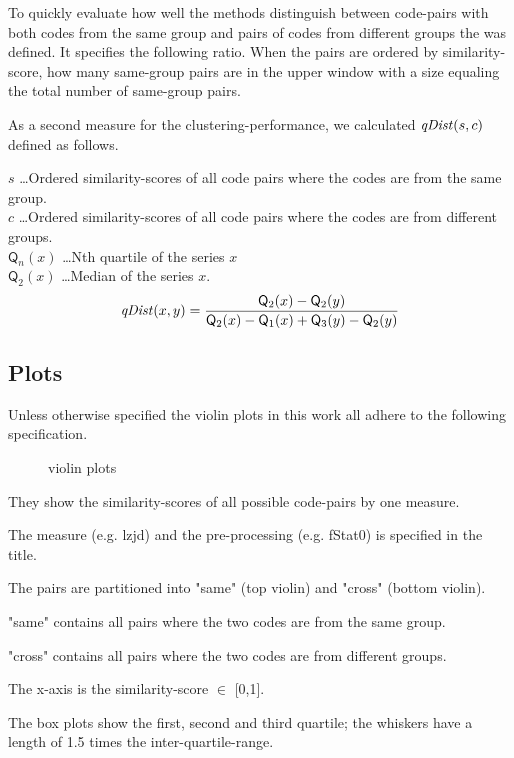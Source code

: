 \documentclass[../main.tex]{subfiles}
\begin{document}
To quickly evaluate how well the methods distinguish between code-pairs with both codes from the same group and pairs of codes from different groups the  was defined.
It specifies the following ratio.
When the pairs are ordered by similarity-score, how many same-group pairs are in the upper window with a size equaling the total number of same-group pairs.

As a second measure for the clustering-performance, we calculated $\mbox{\textit{qDist}}(s,c)$ defined as follows.

$s$ \dots Ordered similarity-scores of all code pairs where the codes are from the same group.\\
$c$ \dots Ordered similarity-scores of all code pairs where the codes are from different groups.\\
$\mathsf{Q}_n(x)$ \dots Nth quartile of the series $x$\\
$\mathsf{Q}_2(x)$ \dots Median of the series $x$.
\begin{equation}
  \mbox{\textit{qDist}}(x,y) = \dfrac{\mathsf{Q}_2(x) - \mathsf{Q}_2(y)}{\mathsf{Q}_2(x) - \mathsf{Q}_1(x) + \mathsf{Q}_3(y) - \mathsf{Q}_2(y)}
  \label{eq:qDist}
\end{equation}

\subsection{Plots}

Unless otherwise specified the violin plots  in this work all adhere to the following specification.

\begin{figure}[ht!]
  \centering

  \caption{violin plots}
  \label{fig:violins}
\end{figure}

\begin{ul}
  \item They show the similarity-scores of all possible code-pairs by one measure.
  \item The measure (e.g. lzjd) and the pre-processing (e.g. fStat0) is specified in the title.
  \item The pairs are partitioned into "same" (top violin) and "cross" (bottom violin).
  \item "same" contains all pairs where the two codes are from the same group.
  \item "cross" contains all pairs where the two codes are from different groups.
  \item The x-axis is the similarity-score $\in$ [0,1].
  \item The box plots show the first, second and third quartile; the whiskers have a length of 1.5 times the inter-quartile-range.
\end{ul}
\end{document}
